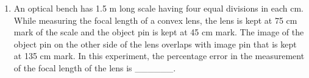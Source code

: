 
\begin{enumerate}
    \item An optical bench has 1.5 m long scale having four equal divisions in each cm. While measuring the focal length of a convex lens, the lens is kept at 75 cm mark of the scale and the object pin is kept at 45 cm mark. The image of the object pin on the other side of the lens overlaps with image pin that is kept at 135 cm mark. In this experiment, the percentage error in the measurement of the focal length of the lens is \_\_\_\_\_\_.
\end{enumerate}
